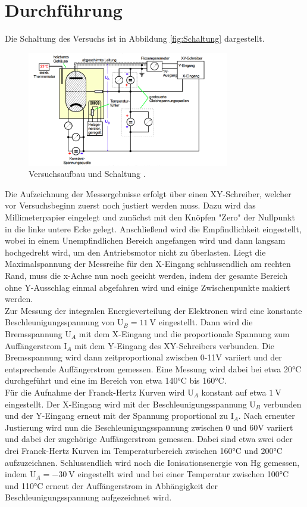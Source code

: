 \section{Durchführung}
Die Schaltung des Versuchs ist in Abbildung \ref{fig:Schaltung} dargestellt.
\begin{figure}[H]
  \centering
  \includegraphics[height=5cm]{Schaltung.png}
  \caption{Versuchsaufbau und Schaltung \cite{skript}.}
  \label{fig:kurve}
\end{figure}
Die Aufzeichnung der Messergebnisse erfolgt über einen XY-Schreiber, welcher vor
Versuchsbeginn zuerst noch justiert werden muss. Dazu wird das Millimeterpapier eingelegt
und zunächst mit den Knöpfen "Zero" der Nullpunkt in die linke untere Ecke gelegt.
Anschließend wird die Empfindlichkeit eingestellt, wobei in einem Unempfindlichen Bereich
angefangen wird und dann langsam hochgedreht wird, um den Antriebsmotor nicht zu überlasten.
Liegt die Maximalspannung der Messreihe für den X-Eingang schlussendlich am rechten Rand,
muss die x-Achse nun noch geeicht werden, indem der gesamte Bereich ohne Y-Ausschlag einmal
abgefahren wird und einige Zwischenpunkte makiert werden. \\
Zur Messung der integralen Energieverteilung der Elektronen wird eine konstante
Beschleunigungsspannung von $\text{U}_B = \SI{11}{\volt}$ eingestellt. Dann wird die
Bremsspannung $\text{U}_A$ mit dem X-Eingang und die proportionale Spannung zum Auffängerstrom $\text{I}_A$
mit dem Y-Eingang des XY-Schreibers verbunden. Die Bremsspannung wird dann zeitproportional
zwischen 0-11$\si{\volt}$ variiert und der entsprechende Auffängerstrom gemessen.
Eine Messung wird dabei bei etwa 20°C durchgeführt und eine im Bereich von etwa
140°C bis 160°C. \\
Für die Aufnahme der Franck-Hertz Kurven wird $\text{U}_A$ konstant auf etwa $\SI{1}{\volt}$
eingestellt. Der X-Eingang wird mit der Beschleunigungsspannung $\text{U}_B$ verbunden
und der Y-Eingang erneut mit der Spannung proportional zu $\text{I}_A$. Nach erneuter
Justierung wird nun die Beschleunigungsspannung zwischen 0 und 60$\si{\volt}$ variiert und dabei
der zugehörige Auffängerstrom gemessen. Dabei sind etwa zwei oder drei Franck-Hertz
Kurven im Temperaturbereich zwischen 160°C und 200°C aufzuzeichnen.
Schlussendlich wird noch die Ionisationsenergie von Hg gemessen, indem $\text{U}_A = - \SI{30}{\volt}$ eingestellt
wird und bei einer Temperatur zwischen 100°C und 110°C erneut der Auffängerstrom in Abhängigkeit
der Beschleunigungsspannung aufgezeichnet wird.
